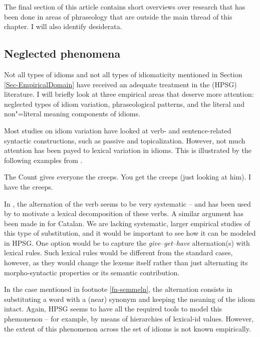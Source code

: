 \documentclass[output=paper]{langsci/langscibook}
\begin{document}
The final section of this article contains short overviews over research that has been done in areas of phraseology that are outside the main thread of this chapter. I will also identify desiderata. 


\subsection{Neglected phenomena}
\label{Sec-Neglected}

Not all types of idioms  and not all types of idiomaticity mentioned in Section \ref{Sec-EmpiricalDomain} have received an adequate treatment in the (HPSG) literature.
I will briefly look at three empirical areas that deserve more attention: neglected types of idiom variation, phraseological patterns, and the literal and non"=literal meaning components of idioms.

Most studies on idiom variation have looked at verb- and sentence-related syntactic constructions, such as passive and topicalization. 
However, not much attention has been payed to lexical variation in idioms. This is illustrated by the following examples from \citet[, 191]{Richards:01}. 

\eal  \label{creeps}
\ex The Count gives everyone the creeps.
\ex You get the creeps (just looking at him).
\ex I have the creeps.
\zl 

In , the alternation of the verb seems to be very systematic -- and has been used by \cite{Richards:01} to motivate a lexical decomposition of these verbs.
A similar argument has been made in \cite{Mateu:Espinal:07} for Catalan. 
We are lacking systematic, larger empirical studies of this type of substitution, and it would be important to see how it can be modeled in HPSG. 
One option would be to capture the \emph{give}--\emph{get}--\emph{have} alternation(s) with lexical rules. Such lexical rules would be different from the standard cases, however, as they would change the lexeme itself rather than just alternating its morpho-syntactic properties or its semantic contribution.

In the case mentioned in footnote \ref{fn-semmeln}, the alternation consists in substituting a word with a (near) synonym and keeping the meaning of the idiom intact. Again, HPSG seems to have all the required tools to model this phemonenon -- for example, by means of hierarchies of lexical-id values. 
However, the extent of this phenomenon across the set of idioms is not known empirically. 
\end{document}
